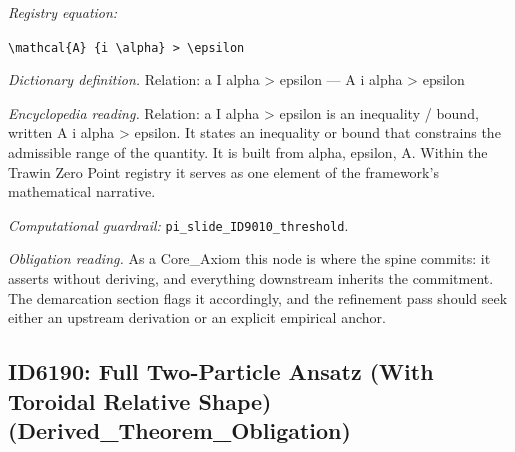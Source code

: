 \documentclass[11pt]{article}
\theoremstyle{remark}
\begin{document}
\noindent\textit{Registry equation:}\par
{\small\texttt{\textbackslash{}mathcal\{A\} \{i \textbackslash{}alpha\} > \textbackslash{}epsilon}}\par\medskip
\noindent\textit{Dictionary definition.} Relation: a I alpha > epsilon --- A i alpha > epsilon\par\medskip
\noindent\textit{Encyclopedia reading.} Relation: a I alpha > epsilon is an inequality / bound, written A i alpha > epsilon. It states an inequality or bound that constrains the admissible range of the quantity. It is built from alpha, epsilon, A. Within the Trawin Zero Point registry it serves as one element of the framework's mathematical narrative.
\par\medskip\noindent\textit{Computational guardrail:} \texttt{pi\_slide\_ID9010\_threshold}.
\par\medskip\noindent\textit{Obligation reading.} As a Core\_Axiom this node is where the spine commits: it asserts without deriving, and everything downstream inherits the commitment. The demarcation section flags it accordingly, and the refinement pass should seek either an upstream derivation or an explicit empirical anchor.

\subsection{ID6190: Full Two-Particle Ansatz (With Toroidal Relative Shape) (Derived\_Theorem\_Obligation)}
\end{document}
